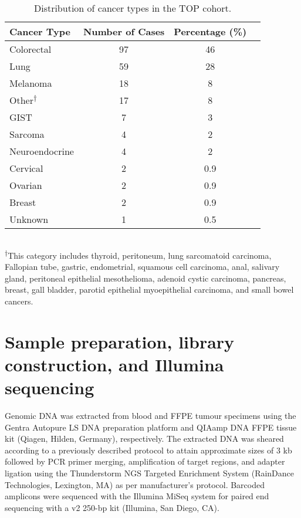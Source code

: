 \begin{table}[H]
\caption{Distribution of cancer types in the TOP cohort.}
\label{tbl:cancertypes}
\centering
      \begin{tabular}{lccc}
        \hline
        Cancer Type & Number of Cases & Percentage (\%) \\ \hline
        Colorectal & 97 & 46 \\
        Lung & 59 & 28 \\
        Melanoma & 18 & 8 \\
				Other\textsuperscript{$\dagger$} & 17 & 8 \\
				GIST & 7 & 3 \\
				Sarcoma & 4 & 2 \\
				Neuroendocrine & 4 & 2 \\
				Cervical & 2 & 0.9 \\
				Ovarian & 2 & 0.9 \\
				Breast & 2 & 0.9 \\
				Unknown & 1 & 0.5 \\ \hline
      \end{tabular} \\
			\vspace{0.5cm}
\justify
{\small \textsuperscript{$\dagger$}This category includes thyroid, peritoneum, lung sarcomatoid carcinoma, Fallopian tube, gastric, endometrial, squamous cell carcinoma, anal, salivary gland, peritoneal epithelial mesothelioma, adenoid cystic carcinoma, pancreas, breast, gall bladder, parotid epithelial myoepithelial carcinoma, and small bowel cancers.}
\end{table}

\section{Sample preparation, library construction, and Illumina sequencing}
\label{sec:Samplepreparation,libraryconstruction,andIlluminasequencing}

Genomic DNA was extracted from blood and FFPE tumour specimens using the Gentra Autopure LS DNA preparation platform and QIAamp DNA FFPE tissue kit (Qiagen, Hilden, Germany), respectively. The extracted DNA was sheared according to a previously described protocol \cite{Bosdet2013} to attain approximate sizes of 3 kb followed by PCR primer merging, amplification of target regions, and adapter ligation using the Thunderstorm NGS Targeted Enrichment System (RainDance Technologies, Lexington, MA) as per manufacturer's protocol. Barcoded amplicons were sequenced with the Illumina MiSeq system for paired end sequencing with a v2 250-bp kit (Illumina, San Diego, CA).


